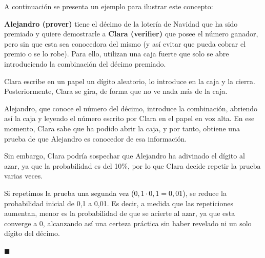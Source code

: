 \documentclass[a4paper,12pt]{report}
\begin{document}
	\vspace{0.2cm}
	\noindent A continuación se presenta un ejemplo para ilustrar este concepto:
	
	\begin{mi_ejemplo}[H]
		\centering
		
		\begin{minipage}{0.95\textwidth}
			
			\noindent \textbf{Alejandro (prover)} tiene el décimo de la lotería de Navidad que ha sido premiado y quiere demostrarle a \textbf{Clara (verifier)} que posee el número ganador, pero sin que esta sea conocedora del mismo (y así evitar que pueda cobrar el premio o se lo robe). Para ello, utilizan una caja fuerte que solo se abre introduciendo la combinación del décimo premiado.
			
			\vspace{0.2cm}
			
			\noindent Clara escribe en un papel un dígito aleatorio, lo introduce en la caja y la cierra. Posteriormente, Clara se gira, de forma que no ve nada más de la caja.
			
			\vspace{0.2cm}
			
			\noindent Alejandro, que conoce el número del décimo, introduce la combinación, abriendo así la caja y leyendo el número escrito por Clara en el papel en voz alta. En ese momento, Clara sabe que ha podido abrir la caja, y por tanto, obtiene una prueba de que Alejandro es conocedor de esa información. 
			
			\vspace{0.2cm}
			
			\noindent Sin embargo, Clara podría sospechar que Alejandro ha adivinado el dígito al azar, ya que la probabilidad es del 10\%, por lo que Clara decide repetir la prueba varias veces.
			
			\vspace{0.2cm}
			
			\noindent \textcolor{black}{Si repetimos la prueba una segunda vez ($0,1 \cdot 0,1 = 0,01$)}, se reduce la probabilidad inicial de 0,1 a 0,01. Es decir, a medida que las repeticiones aumentan, menor es la probabilidad de que se acierte al azar, ya que esta converge a 0, alcanzando así una certeza práctica sin haber revelado ni un solo dígito del décimo.
			
		\end{minipage}
		\caption{Zero Knowledge Proof} 
		\label{ex:loteria}
		
		\hspace*{\fill} $\blacksquare$
	\end{mi_ejemplo}
	
\end{document}
